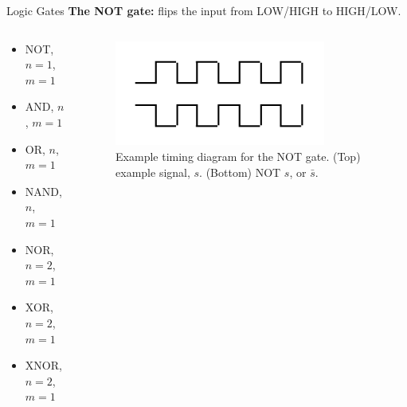 \documentclass{beamer}
\begin{document}
\begin{frame}{Logic Gates}
\textbf{The NOT gate:} flips the input from LOW/HIGH to HIGH/LOW. \\ \vspace{0.5cm}
\begin{columns}[T]
\begin{column}{0.5\textwidth}
\begin{itemize}
\item \alert{NOT, $n=1$, $m=1$}
\item AND, $n$, $m=1$
\item OR, $n$, $m=1$
\item NAND, $n$, $m=1$
\item NOR, $n=2$, $m=1$
\item XOR, $n=2$, $m=1$
\item XNOR, $n=2$, $m=1$
\end{itemize}
\end{column}
\begin{column}{0.5\textwidth}
\begin{figure}
\centering
\includegraphics[width=0.8\textwidth]{figures/TimingNot.pdf}
\caption{\label{fig:not2} Example timing diagram for the NOT gate.  (Top) example signal, $s$.  (Bottom) NOT $s$, or $\bar{s}$.}
\end{figure}
\end{column}
\end{columns}
\end{frame}
\end{document}
